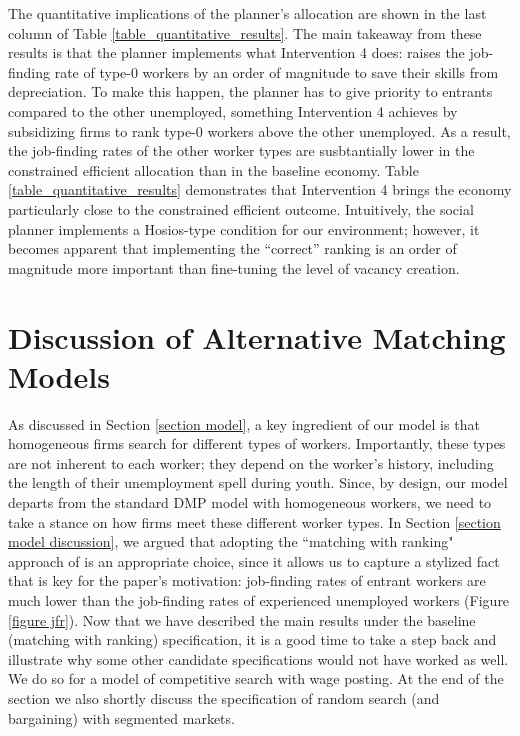 \documentclass[12pt]{article} %
\theoremstyle{definition}
\begin{document}
The quantitative implications of the planner's allocation are shown in the last column of Table \ref{table_quantitative_results}.
The main takeaway from these results is that the planner implements what Intervention 4 does: raises the job-finding rate of type-0 workers by an order of magnitude to save their skills from depreciation.
To make this happen, the planner has to give priority to entrants compared to the other unemployed, something Intervention 4 achieves by subsidizing firms to rank type-0 workers above the other unemployed.
As a result, the job-finding rates of the other worker types are susbtantially lower in the constrained efficient allocation than in the baseline economy.
Table \ref{table_quantitative_results} demonstrates that Intervention 4 brings the economy particularly close to the constrained efficient outcome. 
Intuitively, the social planner implements a Hosios-type condition for our environment; however, it becomes apparent that implementing the ``correct'' ranking is an order of magnitude more important than fine-tuning the level of vacancy creation.



\section{Discussion of Alternative Matching Models}\label{section competitive search} 

As discussed in Section \ref{section model}, a key ingredient  of our model is that homogeneous firms search for different types of workers. Importantly, these types are not inherent to each worker; they depend on the worker's history, including the length of their unemployment spell during youth. Since, by design, our model departs from the standard DMP model with homogeneous workers, we need to take a stance on how firms meet these different worker types. In Section \ref{section model discussion}, we argued that adopting the ``matching with ranking" approach of \cite{petrongolo2001looking} is an appropriate choice, since it allows us to capture a stylized fact that is key for the paper's motivation: job-finding rates of entrant workers are much lower than the job-finding rates of experienced unemployed workers (Figure \ref{figure jfr}). Now that we have described the main results under the baseline (matching with ranking) specification, it is a good time to take a step back and illustrate why some other candidate specifications would not have worked as well. We do so for a model of competitive search with wage posting. At the end of the section we also shortly discuss the specification of random search (and bargaining) with segmented markets. 
\end{document}
